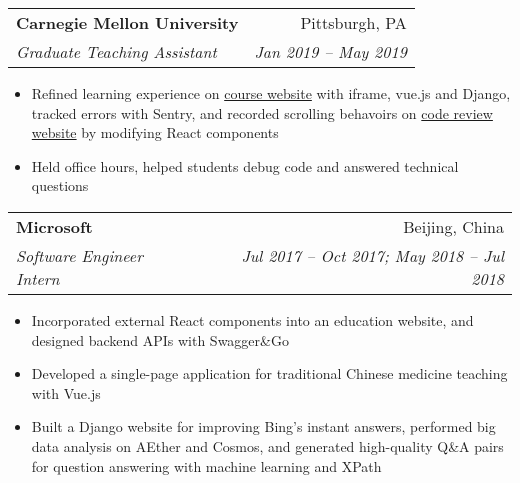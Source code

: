 \documentclass[letterpaper,11pt]{article}
\makeatletter
\newcommand{\resumeItemCustom}[1]{
  \item[$\bullet$]\small{
    #1 \vspace{-2pt}
  }
}
\newcommand{\resumeSubheading}[4]{
  \vspace{-1pt}\item[]
    \begin{tabular*}{0.97\textwidth}[t]{l@{\extracolsep{\fill}}r}
      \textbf{\small#1} & {\small#2} \\
      \textit{\small#3} & \textit{\small#4} \\
    \end{tabular*}\vspace{-5pt}
}
\newcommand{\resumeItemListStart}{\begin{itemize}}
\newcommand{\resumeItemListEnd}{\end{itemize}\vspace{-5pt}}
\makeatother
\begin{document}
    \resumeSubheading
      {Carnegie Mellon University}{Pittsburgh, PA}
      {Graduate Teaching Assistant}{Jan 2019 -- May 2019}
      \resumeItemListStart
        \resumeItemCustom{
            Refined learning experience on \href{https://theproject.zone/}{course website} with iframe, vue.js and Django, tracked errors with Sentry, and recorded scrolling behavoirs on \href{https://codereview.theproject.zone/}{code review website} by modifying React components
        }
        \resumeItemCustom{
          Held office hours, helped students debug code and answered technical questions
        }
      \resumeItemListEnd

    \resumeSubheading
      {Microsoft}{Beijing, China}
      {Software Engineer Intern}{Jul 2017 -- Oct 2017; May 2018 -- Jul 2018}
      \resumeItemListStart
        \resumeItemCustom{
        Incorporated external React components into an education website, and designed backend APIs with Swagger\&Go
        }
        \resumeItemCustom{
            Developed a single-page application for traditional Chinese medicine teaching with Vue.js
        }
        \resumeItemCustom{
            Built a Django website for improving Bing's instant answers, performed big data analysis on AEther and Cosmos, and generated high-quality Q\&A pairs for question answering with machine learning and XPath
        }
      \resumeItemListEnd
\end{document}

